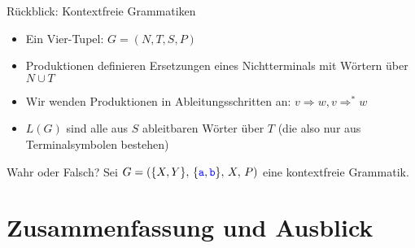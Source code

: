 
\newcommand{\handout}{}



\morescalingdelimiters



\framePrevEpisode

\begin{frame}{Rückblick: Kontextfreie Grammatiken}
	\begin{itemize}[<+->]
		\item Ein Vier-Tupel: $G = (N, T, S, P)$
		\item Produktionen definieren Ersetzungen eines Nichtterminals mit Wörtern über $N \cup T$
		\item Wir wenden Produktionen in Ableitungsschritten an: $v \Rightarrow w, v \Rightarrow^* w$
		\item $L(G)$ sind alle aus $S$ ableitbaren Wörter über $T$ (die also nur aus Terminalsymbolen bestehen)
	\end{itemize}
\end{frame}

\begin{frame}[t]{Wahr oder Falsch?}
	\Socrative
	Sei $G=(\{X,Y\},\, \{\hbox{\textcolor{blue}{\texttt{a}}}, \hbox{\textcolor{blue}{\texttt{b}}}\},\, X,\, P)$ eine kontextfreie Grammatik. \\
\end{frame}







\appendix
\beginbackup

\section{Zusammenfassung und Ausblick}

